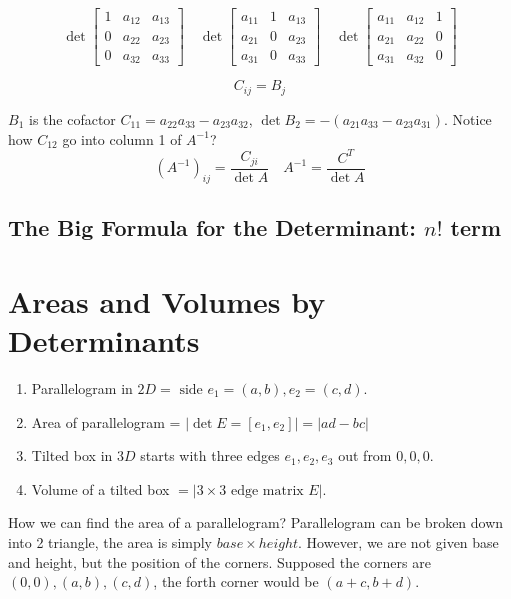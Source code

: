 \[
\det\!\begin{bmatrix}
1 & a_{12} & a_{13}\\
0 & a_{22} & a_{23}\\
0 & a_{32} & a_{33}
\end{bmatrix}\quad
\det\!\begin{bmatrix}
a_{11} & 1 & a_{13}\\
a_{21} & 0 & a_{23}\\
a_{31} & 0 & a_{33}
\end{bmatrix}\quad
\det\!\begin{bmatrix}
a_{11} & a_{12} & 1\\
a_{21} & a_{22} & 0\\
a_{31} & a_{32} & 0
\end{bmatrix}
\]

\[
  C_{ij} = B_j 
\]

\(B_1\) is the cofactor \(C_{11} = a_{22}a_{33} - a_{23}a_{32}\), \(\det B_2 = -(a_{21}a_{33} - a_{23}a_{31})\). Notice how \(C_{12} \) go into column 1 of \(A^{-1} \)? 
\[
  (A^{-1} )_{ij} = \frac{C_{ji} }{\det A} 
  \quad 
  A^{-1} = \frac{C^T}{\det A} 
\]     

\subsection{The Big Formula for the Determinant: \(n!\) term }



\section{Areas and Volumes by Determinants}

\begin{enumerate}
  \item Parallelogram in \(2D = \text{ side } e_1 = (a, b), e_2 = (c, d)\). 
  \item Area of parallelogram = \(\vert \det E = [e_1, e_2] \vert = \vert ad - bc \vert  \)  
  \item Tilted box in \(3D\) starts with three edges \(e_1, e_2, e_3\) out from \(0, 0, 0\). 
  \item Volume of a tilted box \(= \vert 3 \times 3 \text{ edge matrix } E  \vert \).    
\end{enumerate}

How we can find the area of a parallelogram? Parallelogram can be broken down into 2 triangle, the area is simply \(base \times height\). However, we are not given base and height, but the position of the corners. Supposed the corners are \((0, 0), (a, b), (c, d)\), the forth corner would be \((a+c, b+d)\). 


